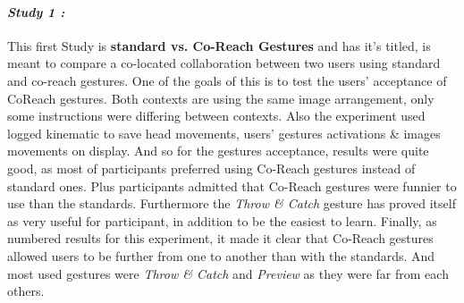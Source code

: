     \paragraph{ \textit{Study 1 :}
                \newline}
    \indent \indent This first Study is \textbf{standard vs. Co-Reach Gestures} and has it's titled, is meant to compare a co-located collaboration between two users using standard and co-reach gestures. 
    One of the goals of this is to test the users' acceptance of CoReach gestures. Both contexts are using the same image arrangement, only some instructions were differing between contexts. Also the experiment used 
    logged kinematic to save head movements, users' gestures activations \& images movements on display. 
    \newline
    \indent \indent And so for the gestures acceptance, results were quite good, as most of participants preferred using Co-Reach gestures instead of standard ones. Plus participants admitted that Co-Reach gestures were 
    funnier to use than the standards. Furthermore the \textit{Throw \& Catch} gesture has proved itself as very useful for participant, in addition to be the easiest to learn. 
    \newline
    \indent \indent Finally, as numbered results for this experiment, it made it clear that Co-Reach gestures allowed users to be further from one to another than with the standards. And most used gestures were 
    \textit{Throw \& Catch} and \textit{Preview} as they were far from each others.  
    
